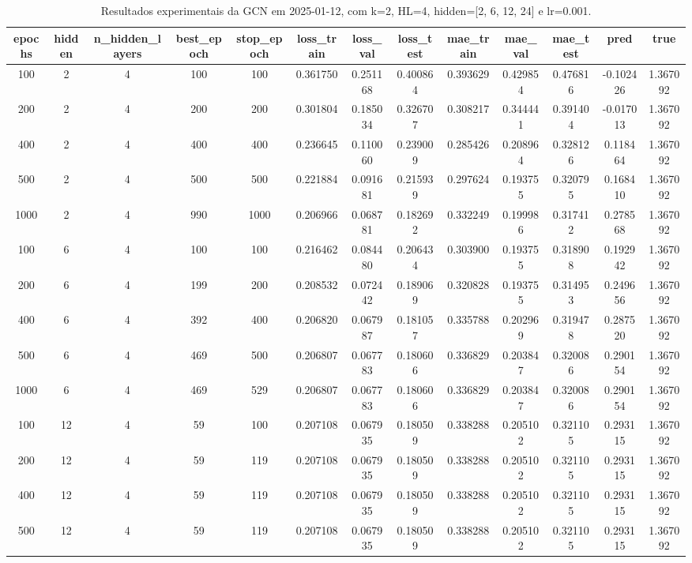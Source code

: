 \begin{table}[h]
\centering
\caption{Resultados experimentais da GCN em 2025-01-12, com k=2, HL=4, hidden=[2, 6, 12, 24] e lr=0.001.}
\label{tab:gcn_results_k2_hl4_d20250112}
\begin{tabular}{ccccccccccccc}
\toprule
epochs & hidden & n\_hidden\_layers & best\_epoch & stop\_epoch & loss\_train & loss\_val & loss\_test & mae\_train & mae\_val & mae\_test & pred & true \\
\midrule
100 & 2 & 4 & 100 & 100 & 0.361750 & 0.251168 & 0.400864 & 0.393629 & 0.429854 & 0.476816 & -0.102426 & 1.367092 \\
200 & 2 & 4 & 200 & 200 & 0.301804 & 0.185034 & 0.326707 & 0.308217 & 0.344441 & 0.391404 & -0.017013 & 1.367092 \\
400 & 2 & 4 & 400 & 400 & 0.236645 & 0.110060 & 0.239009 & 0.285426 & 0.208964 & 0.328126 & 0.118464 & 1.367092 \\
500 & 2 & 4 & 500 & 500 & 0.221884 & 0.091681 & 0.215939 & 0.297624 & 0.193755 & 0.320795 & 0.168410 & 1.367092 \\
1000 & 2 & 4 & 990 & 1000 & 0.206966 & 0.068781 & 0.182692 & 0.332249 & 0.199986 & 0.317412 & 0.278568 & 1.367092 \\
100 & 6 & 4 & 100 & 100 & 0.216462 & 0.084480 & 0.206434 & 0.303900 & 0.193755 & 0.318908 & 0.192942 & 1.367092 \\
200 & 6 & 4 & 199 & 200 & 0.208532 & 0.072442 & 0.189069 & 0.320828 & 0.193755 & 0.314953 & 0.249656 & 1.367092 \\
400 & 6 & 4 & 392 & 400 & 0.206820 & 0.067987 & 0.181057 & 0.335788 & 0.202969 & 0.319478 & 0.287520 & 1.367092 \\
500 & 6 & 4 & 469 & 500 & 0.206807 & 0.067783 & 0.180606 & 0.336829 & 0.203847 & 0.320086 & 0.290154 & 1.367092 \\
1000 & 6 & 4 & 469 & 529 & 0.206807 & 0.067783 & 0.180606 & 0.336829 & 0.203847 & 0.320086 & 0.290154 & 1.367092 \\
100 & 12 & 4 & 59 & 100 & 0.207108 & 0.067935 & 0.180509 & 0.338288 & 0.205102 & 0.321105 & 0.293115 & 1.367092 \\
200 & 12 & 4 & 59 & 119 & 0.207108 & 0.067935 & 0.180509 & 0.338288 & 0.205102 & 0.321105 & 0.293115 & 1.367092 \\
400 & 12 & 4 & 59 & 119 & 0.207108 & 0.067935 & 0.180509 & 0.338288 & 0.205102 & 0.321105 & 0.293115 & 1.367092 \\
500 & 12 & 4 & 59 & 119 & 0.207108 & 0.067935 & 0.180509 & 0.338288 & 0.205102 & 0.321105 & 0.293115 & 1.367092 \\

\end{tabular}
\end{table}
